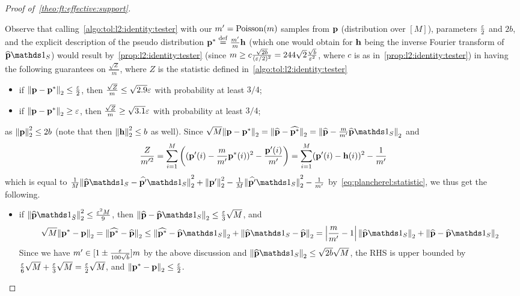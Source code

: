 \begin{proof}[Proof of~\cref{theo:ft:effective:support}]
\begin{itemize}
    Observe that calling~\cref{algo:tol:l2:identity:tester} with our $m'=\operatorname{Poisson}\!\left( m \right) $ samples from $\mathbf{p}$ (distribution over $[M]$), parameters $\frac{\varepsilon}{2}$ and $2b$, and the explicit description of the pseudo distribution $\mathbf{p}^\ast\stackrel{\rm def}{=} \frac{m'}{m}\mathbf{h}$ (which one would obtain for $\mathbf{h}$ being the inverse Fourier transform of $\fourier{\q}\indicSet{S}$) would result by~\cref{prop:l2:identity:tester} (since $m \geq c\frac{\sqrt{2b}}{(\varepsilon/2)^2} = 244\sqrt{2}\frac{\sqrt{b}}{\varepsilon^2}$, where $c$ is as in~\cref{prop:l2:identity:tester}) in having the following guarantees on $\frac{\sqrt{Z}}{m}$, where $Z$ is the statistic defined in~\cref{algo:tol:l2:identity:tester}
    \begin{itemize}
      \item if ${\lVert\mathbf{p}-\mathbf{p}^\ast{\rVert}}_2 \leq \frac{\varepsilon}{2}$, then $\frac{\sqrt{Z}}{m} \leq \sqrt{2.9}\varepsilon$ with probability at least $3/4$;
      \item if ${\lVert\mathbf{p}-\mathbf{p}^\ast{\rVert}}_2 \geq \varepsilon$, then $\frac{\sqrt{Z}}{m} \geq \sqrt{3.1}\varepsilon$ with probability at least $3/4$;
    \end{itemize}
    as ${\lVert\mathbf{p}{\rVert}}_2^2 \leq 2b$ (note that then ${\lVert\mathbf{h}{\rVert}}_2^2 \leq b$ as well). Since $\sqrt{M}\normtwo{\q-\p^\ast} = \normtwo{\fourier{\q}-\fourier{\p^\ast}} = \normtwo{\fourier{\q}-\frac{m}{m'}\fourier{\q}\indicSet{S}}$ and     \[
      \frac{Z}{m'^2} = \sum_{i=1}^M \left( (\mathbf{p}'(i)-\frac{m}{m'}\mathbf{p}^\ast(i))^2 - \frac{\mathbf{p}'(i)}{m'} \right) = \sum_{i=1}^M (\mathbf{p}'(i)-\mathbf{h}(i))^2 - \frac{1}{m'}
    \]
    which is equal to $\frac{1}{M}\normtwo{\fourier{\q}\indicSet{S}-\fourier{\q'}\indicSet{S}}^2 + \normtwo{\q'}^2 - \frac{1}{M}\normtwo{\fourier{\q'}\indicSet{S}}^2 - \frac{1}{m'}$ by~\cref{eq:plancherel:statistic}, we thus get the following.
    \begin{itemize}
      \item if $\normtwo{\fourier{\q}\indicSet{\bar{S}}}^2 \leq \frac{\eps^2M}{9}$, then $\normtwo{\fourier{\q}-\fourier{\q}\indicSet{S}} \leq \frac{\eps}{3}\sqrt{M}$, and
      \[
          \sqrt{M}\normtwo{\p^\ast-\q} = \normtwo{\fourier{\p^\ast}-\fourier{\q}} \leq \normtwo{\fourier{\p^\ast}-\fourier{\q}\indicSet{S}} + \normtwo{\fourier{\q}\indicSet{S}-\fourier{\q}}
          = \abs{\frac{m}{m'}-1}\normtwo{\fourier{\q}\indicSet{S}} + \normtwo{\fourier{\q}-\fourier{\q}\indicSet{S}}
      \]
      Since we have $m'\in[1\pm\frac{\varepsilon}{100\sqrt{b}}]m$ by the above discussion and $\normtwo{\fourier{\q}\indicSet{S}}\leq \sqrt{2b}\sqrt{M}$, the RHS is upper bounded by $\frac{\varepsilon}{6}\sqrt{M} + \frac{\varepsilon}{3}\sqrt{M} = \frac{\varepsilon}{2}\sqrt{M}$, and ${\lVert\mathbf{p}^\ast-\mathbf{p}{\rVert}}_2 \leq \frac{\varepsilon}{2}$.

\end{itemize}
\end{itemize}
\end{proof}
